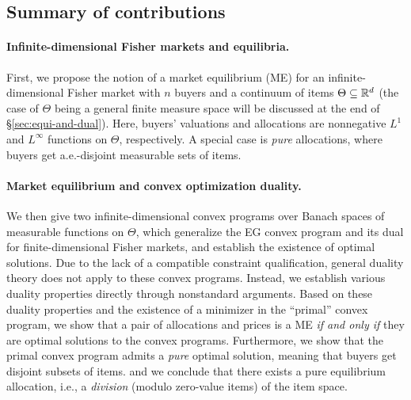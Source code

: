 
\subsection{Summary of contributions}
\paragraph{Infinite-dimensional Fisher markets and equilibria.} First, we propose the notion of a market equilibrium (ME) for an infinite-dimensional Fisher market with $n$ buyers and a continuum of items $\Theta\subseteq \mathbb{R}^d$ (the case of $\Theta$ being a general finite measure space will be discussed at the end of \S \ref{sec:equi-and-dual}).
Here, buyers' valuations and allocations are nonnegative $L^1$ and $L^\infty$ functions on $\Theta$, respectively. 
A special case is \emph{pure} allocations, where buyers get a.e.-disjoint measurable sets of items. 

\paragraph{Market equilibrium and convex optimization duality.}
We then give two infinite-dimensional convex programs over Banach spaces of measurable functions on $\Theta$, which generalize the EG convex program and its dual for finite-dimensional Fisher markets, and establish the existence of optimal solutions.
Due to the lack of a compatible constraint qualification, general duality theory does not apply to these convex programs. 
Instead, we establish various duality properties directly through nonstandard arguments. %
Based on these duality properties and the existence of a minimizer in the ``primal'' convex program, we show that a pair of allocations and prices is a ME \textit{if and only if} they are optimal solutions to the convex programs.
Furthermore, we show that the primal convex program admits a \emph{pure} optimal solution, meaning that buyers get disjoint subsets of items.
and we conclude that there exists a pure equilibrium allocation, i.e., a \textit{division} (modulo zero-value items) of the item space.

